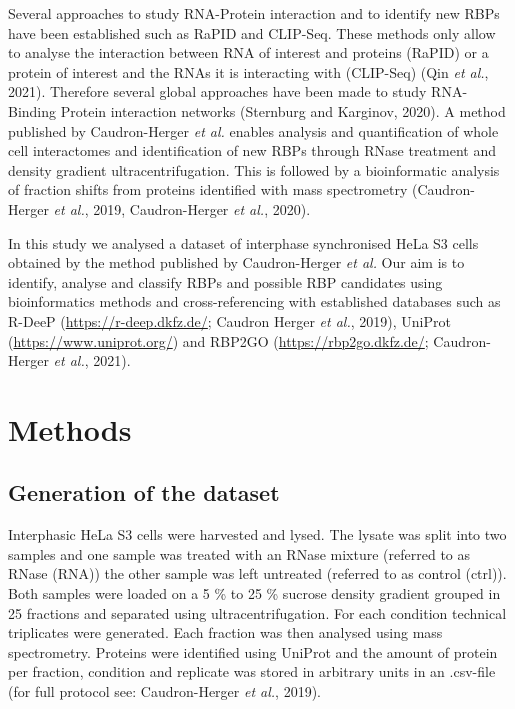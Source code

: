 \documentclass[
]{article}
\begin{document}
Several approaches to study RNA-Protein interaction and to identify new
RBPs have been established such as RaPID and CLIP-Seq. These methods
only allow to analyse the interaction between RNA of interest and
proteins (RaPID) or a protein of interest and the RNAs it is interacting
with (CLIP-Seq) (Qin \emph{et al.}, 2021). Therefore several global
approaches have been made to study RNA-Binding Protein interaction
networks (Sternburg and Karginov, 2020). A method published by
Caudron-Herger \emph{et al.} enables analysis and quantification of
whole cell interactomes and identification of new RBPs through RNase
treatment and density gradient ultracentrifugation. This is followed by
a bioinformatic analysis of fraction shifts from proteins identified
with mass spectrometry (Caudron-Herger \emph{et al.}, 2019,
Caudron-Herger \emph{et al.}, 2020).

In this study we analysed a dataset of interphase synchronised HeLa S3
cells obtained by the method published by Caudron-Herger \emph{et al.}
Our aim is to identify, analyse and classify RBPs and possible RBP
candidates using bioinformatics methods and cross-referencing with
established databases such as R-DeeP (\url{https://r-deep.dkfz.de/};
Caudron Herger \emph{et al.}, 2019), UniProt
(\url{https://www.uniprot.org/}) and RBP2GO
(\url{https://rbp2go.dkfz.de/}; Caudron-Herger \emph{et al.}, 2021).

\newpage

\hypertarget{methods}{%
\section{Methods}\label{methods}}

\hypertarget{generation-of-the-dataset}{%
\subsection{Generation of the dataset}\label{generation-of-the-dataset}}

Interphasic HeLa S3 cells were harvested and lysed. The lysate was split
into two samples and one sample was treated with an RNase mixture
(referred to as RNase (RNA)) the other sample was left untreated
(referred to as control (ctrl)). Both samples were loaded on a 5 \% to
25 \% sucrose density gradient grouped in 25 fractions and separated
using ultracentrifugation. For each condition technical triplicates were
generated. Each fraction was then analysed using mass spectrometry.
Proteins were identified using UniProt and the amount of protein per
fraction, condition and replicate was stored in arbitrary units in an
.csv-file (for full protocol see: Caudron-Herger \emph{et al.}, 2019).
\end{document}
